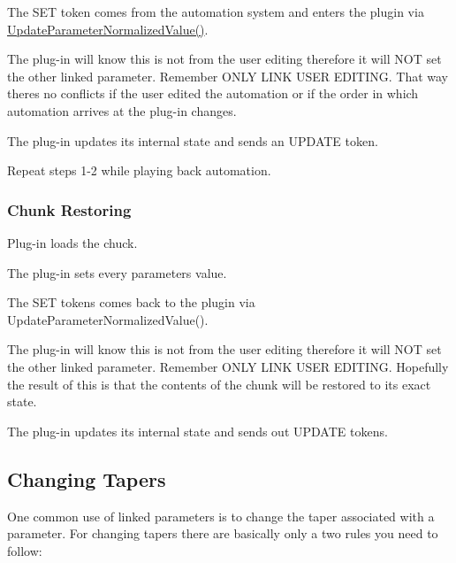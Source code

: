 \begin{DoxyEnumerate}
\item The S\+E\+T token comes from the automation system and enters the plugin via \hyperlink{a00061_a685858711efb8634ce66c327f2865c71}{Update\+Parameter\+Normalized\+Value()}.
\begin{DoxyItemize}
\item The plug-\/in will know this is not from the user editing therefore it will N\+O\+T set the other linked parameter. Remember O\+N\+L\+Y L\+I\+N\+K U\+S\+E\+R E\+D\+I\+T\+I\+N\+G. That way there\textquotesingle{}s no conflicts if the user edited the automation or if the order in which automation arrives at the plug-\/in changes.
\end{DoxyItemize}
\item The plug-\/in updates its internal state and sends an U\+P\+D\+A\+T\+E token.
\item Repeat steps 1-\/2 while playing back automation.
\end{DoxyEnumerate}\hypertarget{a00354_linkedParameters_linkedParameterOperation_chunkRestoring}{}\subsubsection{Chunk Restoring}\label{a00354_linkedParameters_linkedParameterOperation_chunkRestoring}

\begin{DoxyEnumerate}
\item Plug-\/in loads the chuck.
\item The plug-\/in sets every parameters value.
\item The S\+E\+T tokens comes back to the plugin via Update\+Parameter\+Normalized\+Value().
\begin{DoxyItemize}
\item The plug-\/in will know this is not from the user editing therefore it will N\+O\+T set the other linked parameter. Remember O\+N\+L\+Y L\+I\+N\+K U\+S\+E\+R E\+D\+I\+T\+I\+N\+G. Hopefully the result of this is that the contents of the chunk will be restored to its exact state.
\end{DoxyItemize}
\item The plug-\/in updates its internal state and sends out U\+P\+D\+A\+T\+E tokens.
\end{DoxyEnumerate}\hypertarget{a00354_linkedParameters_changingTapers}{}\subsection{Changing Tapers}\label{a00354_linkedParameters_changingTapers}
One common use of linked parameters is to change the taper associated with a parameter. For changing tapers there are basically only a two rules you need to follow\+:


